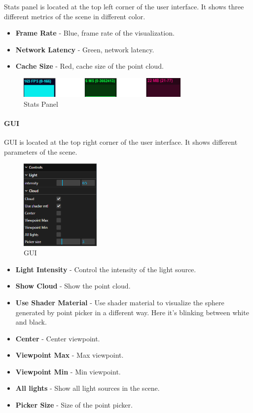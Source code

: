 \documentclass[11pt, a4paper,oneside,chapterprefix=false]{scrbook}
\begin{document}
Stats panel is located at the top left corner of the user interface. It shows three different metrics of the scene in different color.

\begin{itemize}
	\item \textbf{Frame Rate} - Blue, frame rate of the visualization.
	\item \textbf{Network Latency} - Green, network latency.
	\item \textbf{Cache Size} - Red, cache size of the point cloud.
\end{itemize}


\begin{figure}[H]
    \centering
    \includegraphics*[width=0.75\textwidth]{figures/stats panel.png}
    \caption{Stats Panel}
    \label{fig:stats panel}
\end{figure}

\paragraph{GUI}

GUI is located at the top right corner of the user interface. It shows different parameters of the scene.

\begin{figure}[H]
    \centering
    \includegraphics*[width=0.35\textwidth]{figures/GUI.png}
    \caption{GUI}
    \label{fig:gui}
\end{figure}

\begin{itemize}
	\item \textbf{Light Intensity} - Control the intensity of the light source.
	\item \textbf{Show Cloud} - Show the point cloud.
	\item \textbf{Use Shader Material} - Use shader material to visualize the sphere generated by point picker in a different way. Here it's blinking between white and black.
	\item \textbf{Center} - Center viewpoint.
	\item \textbf{Viewpoint Max} - Max viewpoint.
	\item \textbf{Viewpoint Min} - Min viewpoint.
	\item \textbf{All lights} - Show all light sources in the scene.
	\item \textbf{Picker Size} - Size of the point picker.
\end{itemize}
\end{document}
